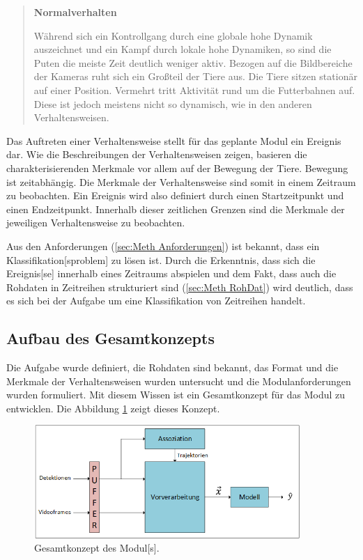 \begin{quote}
\textbf{Normalverhalten}\par
Während sich ein Kontrollgang durch eine globale hohe Dynamik auszeichnet und ein Kampf durch lokale hohe Dynamiken, so sind die Puten die meiste Zeit deutlich weniger aktiv. Bezogen auf die Bildbereiche der Kameras ruht sich ein Großteil der Tiere aus. Die Tiere sitzen stationär auf einer Position. Vermehrt tritt Aktivität rund um die Futterbahnen auf. Diese ist jedoch meistens nicht so dynamisch, wie in den anderen Verhaltensweisen.
\end{quote}
\par

Das Auftreten einer Verhaltensweise stellt für das geplante \gls{Modul} ein \gls{Ereignis} dar. Wie die Beschreibungen der Verhaltensweisen zeigen, basieren die charakterisierenden Merkmale vor allem auf der Bewegung der Tiere. Bewegung ist zeitabhängig. Die Merkmale der Verhaltensweise sind somit in einem Zeitraum zu beobachten. Ein \gls{Ereignis} wird also definiert durch einen Startzeitpunkt und einen Endzeitpunkt. Innerhalb dieser zeitlichen Grenzen sind die Merkmale der jeweiligen Verhaltensweise zu beobachten. \par

Aus den Anforderungen (\autoref{sec:Meth Anforderungen}) ist bekannt, dass ein \gls{Klassifikation}[sproblem] zu lösen ist. Durch die Erkenntnis, dass sich die \gls{Ereignis}[se] innerhalb eines Zeitraums abspielen und dem Fakt, dass auch die Rohdaten in Zeitreihen strukturiert sind (\autoref{sec:Meth RohDat}) wird deutlich, dass es sich bei der Aufgabe um eine \gls{Klassifikation} von Zeitreihen handelt.\par

\subsection{Aufbau des Gesamtkonzepts}
Die Aufgabe wurde definiert, die Rohdaten sind bekannt, das Format und die Merkmale der Verhaltensweisen wurden untersucht und die Modulanforderungen wurden formuliert. Mit diesem Wissen ist ein Gesamtkonzept für das \gls{Modul} zu entwicklen. Die Abbildung \ref{fig:GesKonzpt} zeigt dieses Konzept.

\begin{figure}[htb]
    \centering
    \includegraphics[width=0.9\textwidth]{img/Grafiken/Gesamtkonzept start.png}
    \caption{Gesamtkonzept des \gls{Modul}[s].}
    \label{fig:GesKonzpt}
\end{figure}


